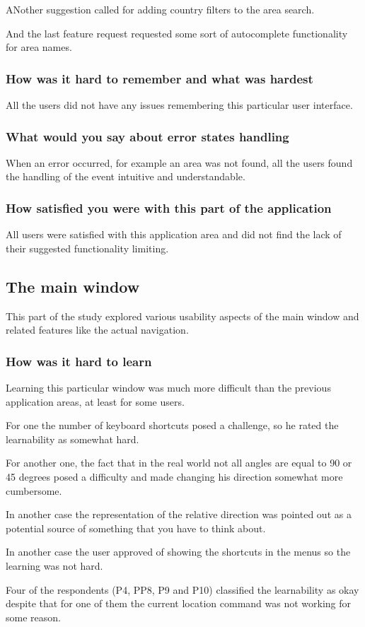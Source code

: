 \documentclass[nolof,digital]{fithesis3}
\begin{document}
ANother suggestion called for adding country filters to the area search. 

And the last feature request requested some sort of autocomplete functionality for area names.
\subsubsection{How was it hard to remember and what was hardest}
All the users did not have any issues remembering this particular user interface.
\subsubsection{What would you say about error states handling}
When an error occurred, for example an area was not found, all the users found the handling of the event intuitive and understandable.
\subsubsection{How satisfied you were with this part of the application}
All users were satisfied with this application area and did not find the lack of their suggested functionality limiting.
\subsection{The main window}
This part of the study explored various usability aspects of the main window and related features like the actual navigation.
\subsubsection{How was it hard to learn}
Learning this particular window was much more difficult than the previous application areas, at least for some users.

For one the number of keyboard shortcuts posed a challenge, so he rated the learnability as somewhat hard.

For another one, the fact that in the real world not all angles are equal to 90 or 45 degrees posed a difficulty and made changing his direction somewhat more cumbersome.

In another case the representation of the relative direction was pointed out as a potential source of something that you have to think about.

In another case the user approved of showing the shortcuts in the menus so the learning was not hard.

Four of the respondents (P4, PP8, P9 and P10) classified the learnability as okay despite that for one of them the current location command was not working for some reason.
\end{document}
